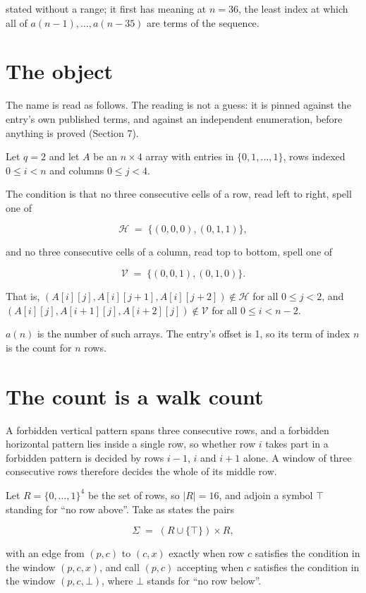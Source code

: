\documentclass[11pt]{article}
\theoremstyle{definition}
\begin{document}
stated without a range; it first has meaning at $n = 36$, the least index at which all of $a(n-1),\dots,a(n-35)$ are terms of the sequence.

\section{The object}

The name is read as follows. The reading is not a guess: it is pinned against the entry's own published terms, and against an independent enumeration, before anything is proved (Section 7).

Let $q = 2$ and let $A$ be an $n \times 4$ array with entries in $\{0,1,\dots,1\}$, rows indexed $0 \le i < n$ and columns $0 \le j < 4$.

The condition is that no three consecutive cells of a row, read left to right, spell one of

\[\mathcal{H} \;=\; \{(0,0,0), (0,1,1)\},\]

and no three consecutive cells of a column, read top to bottom, spell one of

\[\mathcal{V} \;=\; \{(0,0,1), (0,1,0)\}.\]

That is, $(A[i][j],A[i][j{+}1],A[i][j{+}2]) \notin \mathcal{H}$ for all $0 \le j < 2$, and $(A[i][j],A[i{+}1][j],A[i{+}2][j]) \notin \mathcal{V}$ for all $0 \le i < n-2$.

$a(n)$ is the number of such arrays. The entry's offset is 1, so its term of index $n$ is the count for $n$ rows.

\section{The count is a walk count}

A forbidden vertical pattern spans three consecutive rows, and a forbidden horizontal pattern lies inside a single row, so whether row $i$ takes part in a forbidden pattern is decided by rows $i-1$, $i$ and $i+1$ alone. A window of three consecutive rows therefore decides the whole of its middle row.

Let $R = \{0,\dots,1\}^{4}$ be the set of rows, so $|R| = 16$, and adjoin a symbol $\top$ standing for ``no row above''. Take as states the pairs

\[\Sigma \;=\; (R \cup \{\top\}) \times R,\]

with an edge from $(p,c)$ to $(c,x)$ exactly when row $c$ satisfies the condition in the window $(p,c,x)$, and call $(p,c)$ accepting when $c$ satisfies the condition in the window $(p,c,\bot)$, where $\bot$ stands for ``no row below''.
\end{document}
